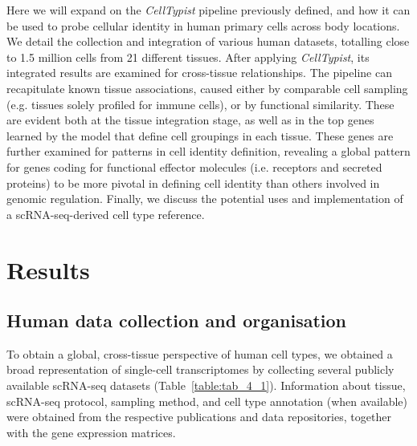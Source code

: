 Here we will expand on the \textit{CellTypist} pipeline previously defined, and how it can be used to probe cellular identity in human primary cells across body locations. We detail the collection and integration of various human datasets, totalling close to 1.5 million cells from 21 different tissues. After applying \textit{CellTypist}, its integrated results are examined for cross-tissue relationships. The pipeline can recapitulate known tissue associations, caused either by comparable cell sampling (e.g. tissues solely profiled for immune cells), or by functional similarity. These are evident both at the tissue integration stage, as well as in the top genes learned by the model that define cell groupings in each tissue. These genes are further examined for patterns in cell identity definition, revealing a global pattern for genes coding for functional effector molecules (i.e. receptors and secreted proteins) to be more pivotal in defining cell identity than others involved in genomic regulation. Finally, we discuss the potential uses and implementation of a scRNA-seq-derived cell type reference.


\section{Results}
\label{section4.2}
\subsection{Human data collection and organisation}
\label{section4.2_coll}
To obtain a global, cross-tissue perspective of human cell types, we obtained a broad representation of single-cell transcriptomes by collecting several publicly available scRNA-seq datasets (Table~\ref{table:tab_4_1}). Information about tissue, scRNA-seq protocol, sampling method, and cell type annotation (when available) were obtained from the respective publications and data repositories, together with the gene expression matrices.

